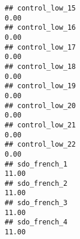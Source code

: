 \documentclass[
]{article}
\begin{document}
\begin{verbatim}
## control_low_15                                                                                                                                                                                                                 0.00
## control_low_16                                                                                                                                                                                                                 0.00
## control_low_17                                                                                                                                                                                                                 0.00
## control_low_18                                                                                                                                                                                                                 0.00
## control_low_19                                                                                                                                                                                                                 0.00
## control_low_20                                                                                                                                                                                                                 0.00
## control_low_21                                                                                                                                                                                                                 0.00
## control_low_22                                                                                                                                                                                                                 0.00
## sdo_french_1                                                                                                                                                                                                                  11.00
## sdo_french_2                                                                                                                                                                                                                  11.00
## sdo_french_3                                                                                                                                                                                                                  11.00
## sdo_french_4                                                                                                                                                                                                                  11.00

\end{verbatim}
\end{document}
